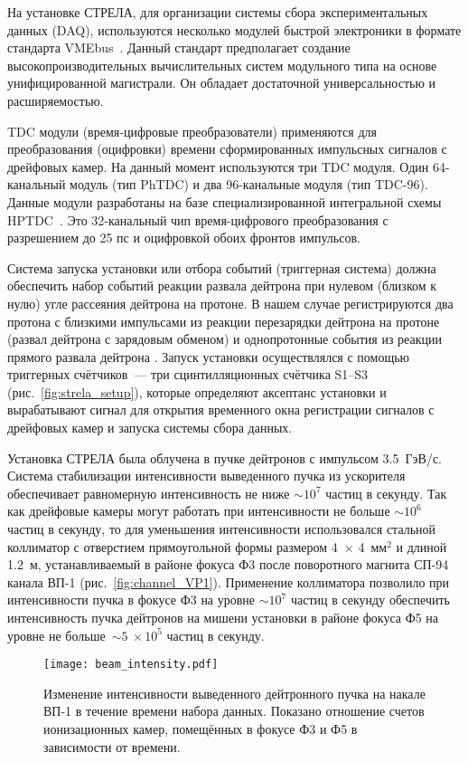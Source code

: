 На установке СТРЕЛА, для организации системы сбора экспериментальных данных
(DAQ), используются несколько модулей быстрой электроники в формате стандарта
VMEbus~\cite{vme85}. Данный стандарт предполагает создание
высокопроизводительных вычислительных систем модульного типа на основе
унифицированной магистрали. Он обладает достаточной универсальностью и
расширяемостью.

TDC модули (время-цифровые преобразователи) применяются для преобразования
(оцифровки) времени сформированных импульсных сигналов с дрейфовых камер. На
данный момент используются три TDC модуля. Один 64-канальный модуль (тип PhTDC)
и два 96-канальные модуля (тип TDC-96). Данные модули разработаны на базе
специализированной интегральной схемы HPTDC~\cite{hptdc04}. Это 32-канальный чип
время-цифрового преобразования с разрешением до 25 пс и оцифровкой обоих фронтов
импульсов.

Система запуска установки или отбора событий (триггерная система) должна
обеспечить набор событий реакции развала дейтрона при нулевом (близком к нулю)
угле рассеяния дейтрона на протоне. В нашем случае регистрируются два протона с
близкими импульсами из реакции перезарядки дейтрона на протоне \dpchex (развал
дейтрона с зарядовым обменом) и однопротонные события из реакции прямого развала
дейтрона \dpret. Запуск установки осуществлялся с помощью триггерных
счётчиков~--- три сцинтилляционных счётчика S1--S3
(рис.~\ref{fig:strela_setup}), которые определяют аксептанс установки и
вырабатывают сигнал для открытия временного окна регистрации сигналов с
дрейфовых камер и запуска системы сбора данных.

Установка СТРЕЛА была облучена в пучке дейтронов с импульсом 3.5~ГэВ/с. Система
стабилизации интенсивности выведенного пучка из ускорителя обеспечивает
равномерную интенсивность не ниже $\sim 10^{7}$ частиц в секунду. Так как
дрейфовые камеры могут работать при интенсивности не больше $\sim 10^{6}$ частиц
в секунду, то для уменьшения интенсивности использовался стальной коллиматор с
отверстием прямоугольной формы размером 4~$\times$ 4~мм$^2$ и длиной 1.2~м,
устанавливаемый в районе фокуса Ф3 после поворотного магнита СП-94 канала ВП-1
(рис.~\ref{fig:channel_VP1}). Применение коллиматора позволило при интенсивности
пучка в фокусе Ф3 на уровне $\sim 10^{7}$ частиц в секунду обеспечить
интенсивность пучка дейтронов на мишени установки в районе фокуса Ф5 на уровне
не больше~$\sim 5~\times 10^{5}$ частиц в секунду.

\begin{figure}[h]
  \centering
  \texttt{[image: beam\_intensity.pdf]}
  \caption{Изменение интенсивности выведенного дейтронного пучка на накале ВП-1
    в течение времени набора данных. Показано отношение счетов ионизационных
    камер, помещённых в фокусе Ф3 и Ф5 в зависимости от времени.}
  \label{fig:beam_intensity}
\end{figure}

